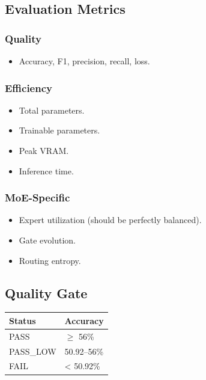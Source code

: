 \subsection{Evaluation Metrics}

\subsubsection{Quality}
\begin{itemize}
\item Accuracy, F1, precision, recall, loss.

\end{itemize}
\subsubsection{Efficiency}
\begin{itemize}
\item Total parameters.
\item Trainable parameters.
\item Peak VRAM.
\item Inference time.

\end{itemize}
\subsubsection{MoE-Specific}
\begin{itemize}
\item Expert utilization (should be perfectly balanced).
\item Gate evolution.
\item Routing entropy.

\end{itemize}
\subsection{Quality Gate}

\begin{table}[H]
\centering
\small
\begin{tabular}{ll}
\toprule
\textbf{Status} & \textbf{Accuracy} \\
\midrule
PASS & $\ge$ 56\% \\
PASS\_LOW & 50.92--56\% \\
FAIL & < 50.92\% \\
\bottomrule
\end{tabular}
\end{table}


